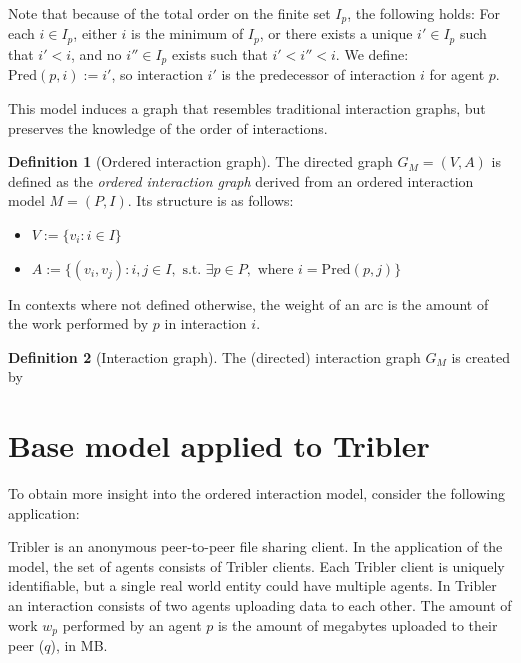 \documentclass[a4paper,11pt]{book}
\newcommand{\pred}{\mathrm{Pred}}
\theoremstyle{definition}
\newtheorem{definition}{Definition}
\begin{document}
Note that because of the total order on the finite set $I_p$, the following holds:
For each $i \in I_p$, either $i$ is the minimum of $I_p$, or there exists
a unique $i' \in I_p$ such that $i' < i$, and no $i'' \in I_p$ exists such that
$i' < i'' < i$. We define: $\pred(p, i) := i'$, so interaction $i'$ is the predecessor
of interaction $i$ for agent $p$.

  
This model induces a graph that resembles traditional interaction graphs, but preserves the knowledge
of the order of interactions.
\begin{definition}[Ordered interaction graph]
    The directed graph $G_M = (V, A)$ is defined as the \emph{ordered interaction graph} derived from an ordered interaction model $M = (P,I)$.
    Its structure is as follows:

    \begin{itemize}
        \item $V := \{ v_{i} : i \in I\}$\\
        \item $A := \{ (v_{i}, v_{j}) : i, j \in I, \mbox{ s.t. } \exists p \in P, \mbox{ where } i = \pred(p, j)\}$
    \end{itemize}

    In contexts where not defined otherwise, the weight of an arc is the amount of the work performed by $p$ in
    interaction $i$. 
\end{definition}


\begin{definition}[Interaction graph]
    The (directed) interaction graph $G_M$ is created by
    

\end{definition}



\section{Base model applied to Tribler}

To obtain more insight into the ordered interaction model, consider the following application:

Tribler is an anonymous peer-to-peer file sharing client. In the application of the model,
the set of agents consists of Tribler clients. Each Tribler client is uniquely identifiable,
but a single real world entity could have multiple agents. In Tribler an interaction
consists of two agents uploading data to each other. The amount of work $w_p$ performed
by an agent $p$ is the amount of megabytes uploaded to their peer ($q$), in MB.
\end{document}
